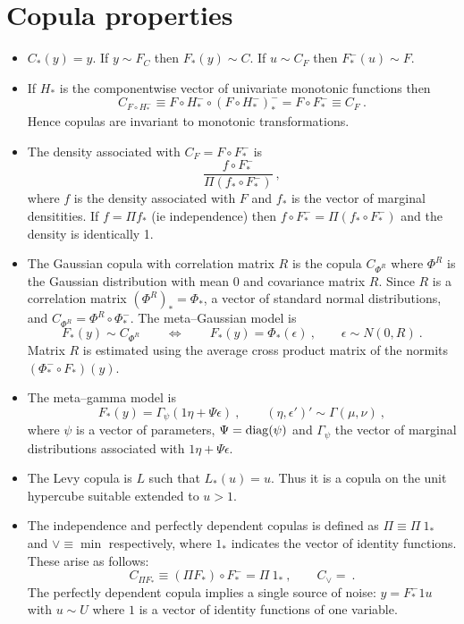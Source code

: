 \documentclass[a4paper,12pt]{article}
\newcommand{\eps}{\epsilon}
\newcommand{\diag}{{\rm diag}}
\begin{document}
\section{Copula properties}
\begin{itemize}
    \item $C_*(y)=y$.  If $y\sim F_C$ then $F_*(y)\sim C$.  If $u\sim C_F$ then $F_*^-(u)\sim F$.
    \item  If $H_*$ is the componentwise  vector of univariate monotonic functions then
$$
C_{F\circ H_*^-}\equiv F\circ H_*^- \circ(F\circ H_*^-)_*^-=F \circ F_*^-\equiv C_F\ .
$$
Hence copulas are invariant to monotonic transformations.
    \item The density associated with $C_F=F\circ F_*^-$ is
    $$
    \frac{f\circ F_*^-}{\Pi (f_*\circ F_*^-)}\ ,
    $$
    where $f$ is the density associated with $F$ and $f_*$ is the vector of marginal densitities.  If $f=\Pi f_*$ (ie independence) then $f\circ F_*^-=\Pi (f_*\circ F_*^-)$ and the density is identically 1.
    \item The Gaussian copula with correlation matrix $R$ is the copula $C_{\Phi^R}$  where $\Phi^R$ is the Gaussian distribution with mean 0 and covariance matrix $R$. Since $R$ is a correlation matrix $(\Phi^R)_*=\Phi_*$, a vector of standard normal distributions, and $C_{\Phi^R}=\Phi^R\circ \Phi_*^-$.   The meta--Gaussian model is
\begin{equation}\label{metaG}
F_*(y)\sim C_{\Phi^R}\qquad\Leftrightarrow\qquad F_*(y) =\Phi_*(\eps)\ , \qquad \eps\sim N(0,R)\ .
\end{equation}
Matrix $R$ is estimated using the average cross product matrix of  the normits  $(\Phi_*^-\circ F_*)(y)$.
\item The meta--gamma model  is
$$
F_*(y)=\Gamma_\psi(1 \eta + \Psi\eps)\ , \qquad (\eta,\eps')'\sim \Gamma(\mu,\nu)\ ,
$$
where $\psi$ is a vector of parameters, $\Psi=\diag(\psi)$ and $\Gamma_\psi$ the vector of marginal distributions associated with $1\eta+\Psi\eps$.
\item  The Levy copula is $L$ such that $L_*(u)=u$.  Thus it is a copula on the unit hypercube suitable extended to $u>1$.
\item The independence and perfectly dependent copulas is defined as $\Pi\equiv\Pi\ 1_*$ and $\vee\equiv\min$ respectively, where $1_*$ indicates the vector of identity functions.  These arise as follows:
$$
C_{\Pi F_*}\equiv(\Pi F_*)\circ F_*^-= \Pi\ 1_*\ ,\qquad C_{\vee}=\ .
$$
The perfectly dependent copula implies a single source of noise:
$y=F_*^-1u$ with $u\sim U$
where $1$ is a vector of  identity functions of one variable.


\end{itemize}
\end{document}
